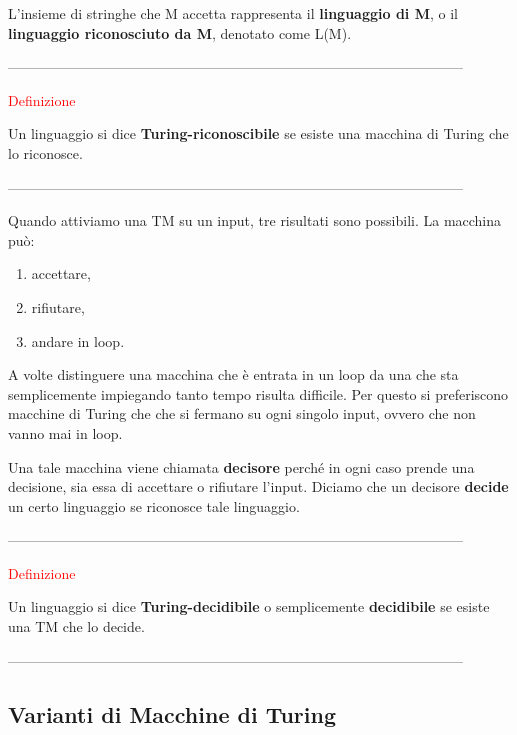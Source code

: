 \documentclass{article}
\begin{document}
L'insieme di stringhe che M accetta rappresenta il \textbf{linguaggio di M}, o il \textbf{linguaggio riconosciuto da M}, denotato come L(M).

--------------------------------------------------------------------------------------------------

\begin{center}
    \textcolor{red}{Definizione}
\end{center}

Un linguaggio si dice \textbf{Turing-riconoscibile} se esiste una macchina di Turing che lo riconosce.

--------------------------------------------------------------------------------------------------

Quando attiviamo una TM su un input, tre risultati sono possibili. La macchina può:

\begin{enumerate}
    \item accettare,
    \item rifiutare,
    \item andare in loop.
\end{enumerate}

A volte distinguere una macchina che è entrata in un loop da una che sta semplicemente impiegando tanto tempo risulta difficile. Per questo si preferiscono macchine di Turing che che si fermano su ogni singolo input, ovvero che non vanno mai in loop. 

Una tale macchina viene chiamata \textbf{decisore} perché in ogni caso prende una decisione, sia essa di accettare o rifiutare l'input. Diciamo che un decisore \textbf{decide} un certo linguaggio se riconosce tale linguaggio.

--------------------------------------------------------------------------------------------------

\begin{center}
    \textcolor{red}{Definizione}
\end{center}

Un linguaggio si dice \textbf{Turing-decidibile} o semplicemente \textbf{decidibile} se esiste una TM che lo decide.

--------------------------------------------------------------------------------------------------

\subsection{Varianti di Macchine di Turing}
\end{document}
